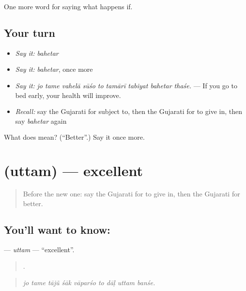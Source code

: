 \begin{grammarlens}[title={What you've built}]
One more word for saying what happens if.
\end{grammarlens}

\subsection*{Your turn}
\begin{itemize}
\raggedright
  \item \emph{Say it:} \emph{bahetar}
  \item \emph{Say it:} \emph{bahetar}, once more
  \item \emph{Say it:} \emph{jo tame vahelā sūśo to tamārī tabiyat bahetar thaśe.} — If you go to bed early, your health will improve.
  \item \emph{Recall:} say the Gujarati for subject to, then the Gujarati for to give in, then say \emph{bahetar} again
\end{itemize}

\begin{tcolorbox}[breakable,colback=teal!4,colframe=teal!35!black,title={Before you move on}]
What does  mean? (\textquotedblleft{}Better\textquotedblright{}.) Say it once more.
\end{tcolorbox}
\section[\texorpdfstring{\gu{ઉત્તમ} (uttam)}{ઉત્તમ (uttam)}]{ (uttam) — excellent}

\label{lesson:GU-C387-uttam}



\begin{quote}
Before the new one: say the Gujarati for to give in, then the Gujarati for better.
\end{quote}

\subsection*{You'll want to know: }
\textbf{} — \emph{uttam} — \textquotedblleft{}excellent\textquotedblright{}.

\begin{quote}
        .
\end{quote}

\begin{quote}
\emph{jo tame tājũ śāk vāparśo to dāḷ uttam banśe.}
\end{quote}

